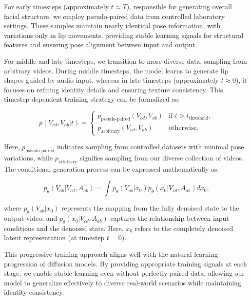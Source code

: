 For early timesteps (approximately $t \approx T$), responsible for generating overall facial structure, we employ pseudo-paired data from controlled laboratory settings. These samples maintain nearly identical pose information, with variations only in lip movements, providing stable learning signals for structural features and ensuring pose alignment between input and output.

For middle and late timesteps, we transition to more diverse data, sampling from arbitrary videos. During middle timesteps, the model learns to generate lip shapes guided by audio input, whereas in late timesteps (approximately $t \approx 0$), it focuses on refining identity details and ensuring texture consistency. This timestep-dependent training strategy can be formalized as:

\begin{equation}
p(V_{cd}, V_{ab}|t) = 
\begin{cases}
p_{\text{pseudo-paired}}(V_{cd}, V_{ab}) & \text{if } t > t_{\text{threshold}}, \\
p_{\text{arbitrary}}(V_{cd}, V_{ab}) & \text{otherwise}.
\end{cases}
\end{equation}
\vspace{-0.5em}

Here, $p_{\text{pseudo-paired}}$ indicates sampling from controlled datasets with minimal pose variations, while $p_{\text{arbitrary}}$ signifies sampling from our diverse collection of videos.
The conditional generation process can be expressed mathematically as:

\vspace{-1em}
\begin{equation}
p_\theta(V_{ab}|V_{cd}, A_{ab}) = \int p_\theta(V_{ab}|x_0)p_\theta(x_0|V_{cd}, A_{ab})dx_0,
\end{equation}
\vspace{-1em}

where $ p_\theta(V_{ab}|x_0) $ represents the mapping from the fully denoised state to the output video, and $ p_\theta(x_0|V_{cd}, A_{ab}) $ captures the relationship between input conditions and the denoised state. Here, $ x_0 $ refers to the completely denoised latent representation (at timestep $ t=0 $).

This progressive training approach aligns well with the natural learning progression of diffusion models. By providing appropriate training signals at each stage, we enable stable learning even without perfectly paired data, allowing our model to generalize effectively to diverse real-world scenarios while maintaining identity consistency.
\vspace{-0.3em}

